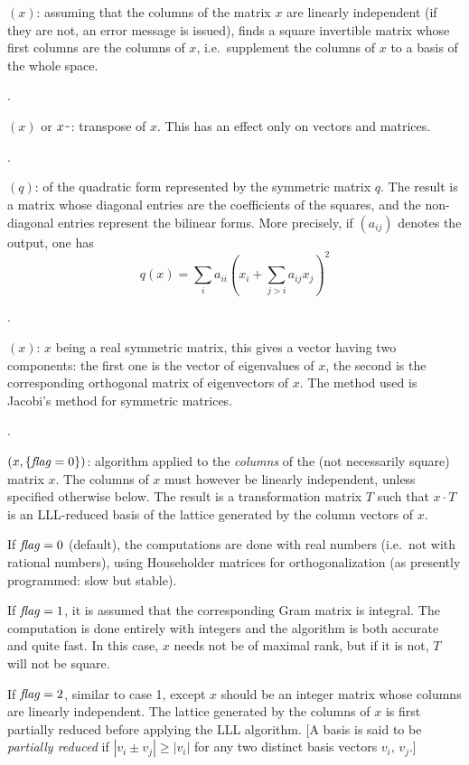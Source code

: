 $(x)$: assuming that the columns of the matrix $x$
are linearly independent (if they are not, an error message is issued), finds
a square invertible matrix whose first columns are the columns of $x$,
i.e.~supplement the columns of $x$ to a basis of the whole space.

.

$(x)$ or $x\til$: transpose of $x$.
This has an effect only on vectors and matrices.

.

$(q)$:  of the
quadratic form represented by the symmetric matrix $q$. The result is a
matrix whose diagonal entries are the coefficients of the squares, and the
non-diagonal entries represent the bilinear forms. More precisely, if
$(a_{ij})$ denotes the output, one has
$$ q(x) = \sum_i a_{ii} (x_i + \sum_{j>i} a_{ij} x_j)^2 $$

.

$(x)$: $x$ being a real symmetric matrix, this gives a
vector having two components: the first one is the vector of eigenvalues of
$x$, the second is the corresponding orthogonal matrix of eigenvectors of
$x$. The method used is Jacobi's method for symmetric matrices.

.

$(x,\{\hbox{\it f\kern0pt lag\/}=0\})$:  algorithm applied to the
\emph{columns} of the (not necessarily square) matrix $x$. The columns of $x$
must however be linearly independent, unless specified otherwise below. The
result is a transformation matrix $T$ such that $x\cdot T$ is an LLL-reduced
basis of the lattice generated by the column vectors of $x$.

If $\hbox{\it f\kern0pt lag\/}=0$ (default), the computations are done with real numbers (i.e.~not
with rational numbers), using Householder matrices for orthogonalization
(as presently programmed: slow but stable).

If $\hbox{\it f\kern0pt lag\/}=1$, it is assumed that the corresponding Gram matrix is integral.
The computation is done entirely with integers and the algorithm is both
accurate and quite fast. In this case, $x$ needs not be of maximal rank, but
if it is not, $T$ will not be square.

If $\hbox{\it f\kern0pt lag\/}=2$, similar to case 1, except $x$ should be an integer matrix whose
columns are linearly independent. The lattice generated by the columns of
$x$ is first partially reduced before applying the LLL algorithm. [A basis
is said to be \emph{partially reduced} if $|v_i \pm v_j| \geq |v_i|$ for any
two distinct basis vectors $v_i, \, v_j$.]

